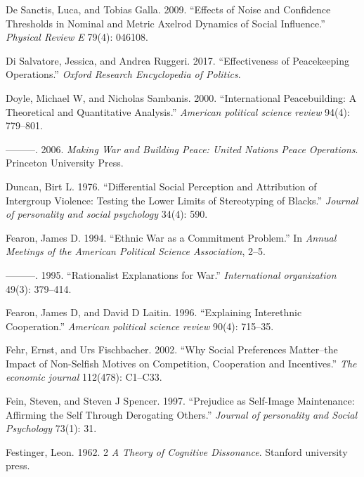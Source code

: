 \documentclass[11pt]{article}
\begin{document}
\leavevmode\hypertarget{ref-de2009effects}{}%
De Sanctis, Luca, and Tobias Galla. 2009. ``Effects of Noise and
Confidence Thresholds in Nominal and Metric Axelrod Dynamics of Social
Influence.'' \emph{Physical Review E} 79(4): 046108.

\leavevmode\hypertarget{ref-di2017effectiveness}{}%
Di Salvatore, Jessica, and Andrea Ruggeri. 2017. ``Effectiveness of
Peacekeeping Operations.'' \emph{Oxford Research Encyclopedia of
Politics}.

\leavevmode\hypertarget{ref-doyle2000international}{}%
Doyle, Michael W, and Nicholas Sambanis. 2000. ``International
Peacebuilding: A Theoretical and Quantitative Analysis.'' \emph{American
political science review} 94(4): 779--801.

\leavevmode\hypertarget{ref-doyle2006making}{}%
---------. 2006. \emph{Making War and Building Peace: United Nations
Peace Operations}. Princeton University Press.

\leavevmode\hypertarget{ref-duncan1976differential}{}%
Duncan, Birt L. 1976. ``Differential Social Perception and Attribution
of Intergroup Violence: Testing the Lower Limits of Stereotyping of
Blacks.'' \emph{Journal of personality and social psychology} 34(4):
590.

\leavevmode\hypertarget{ref-fearon1994ethnic}{}%
Fearon, James D. 1994. ``Ethnic War as a Commitment Problem.'' In
\emph{Annual Meetings of the American Political Science Association},
2--5.

\leavevmode\hypertarget{ref-fearon1995rationalist}{}%
---------. 1995. ``Rationalist Explanations for War.''
\emph{International organization} 49(3): 379--414.

\leavevmode\hypertarget{ref-fearon1996explaining}{}%
Fearon, James D, and David D Laitin. 1996. ``Explaining Interethnic
Cooperation.'' \emph{American political science review} 90(4): 715--35.

\leavevmode\hypertarget{ref-fehr2002social}{}%
Fehr, Ernst, and Urs Fischbacher. 2002. ``Why Social Preferences
Matter--the Impact of Non-Selfish Motives on Competition, Cooperation
and Incentives.'' \emph{The economic journal} 112(478): C1--C33.

\leavevmode\hypertarget{ref-fein1997prejudice}{}%
Fein, Steven, and Steven J Spencer. 1997. ``Prejudice as Self-Image
Maintenance: Affirming the Self Through Derogating Others.''
\emph{Journal of personality and Social Psychology} 73(1): 31.

\leavevmode\hypertarget{ref-festinger1962cognitiveDissonance}{}%
Festinger, Leon. 1962. 2 \emph{A Theory of Cognitive Dissonance}.
Stanford university press.
\end{document}
